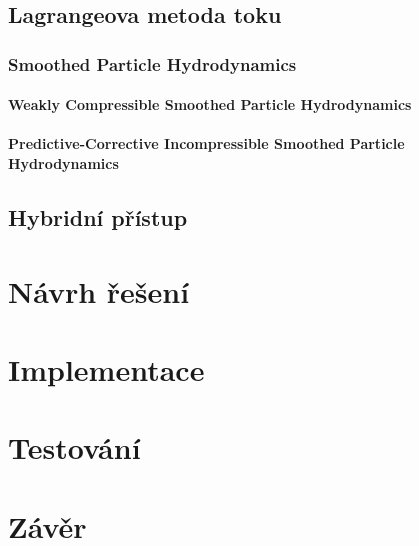 \section{Lagrangeova metoda toku}
\subsection{Smoothed Particle Hydrodynamics}
\subsubsection{Weakly Compressible Smoothed Particle Hydrodynamics}
\subsubsection{Predictive-Corrective Incompressible Smoothed Particle Hydrodynamics}
\section{Hybridní přístup}




\chapter{Návrh řešení}
\label{chapter:navrh_resení}

\chapter{Implementace}
\label{chapter:implementace}

\chapter{Testování}
\label{chapter:testovani}

\chapter{Závěr}
\label{chapter:zaver}





